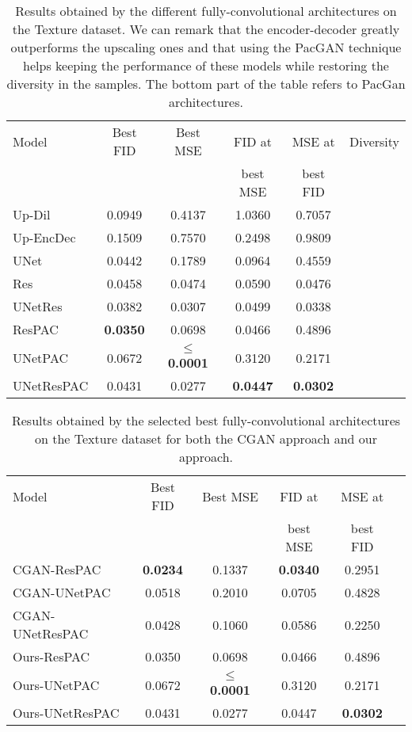 \begin{table}
	\centering
	\begin{tabular}{|l|c|c|c|c|c|}
		\hline
		Model           & Best FID & Best MSE & FID at & MSE at & Diversity\\
		&&&best MSE & best FID & \\
		\hline
		Up-Dil      & 0.0949 & 0.4137 & 1.0360 & 0.7057 & {\color{green}\cmark } \\
		Up-EncDec  & 0.1509 & 0.7570 & 0.2498 & 0.9809 & {\color{green}\cmark } \\
		UNet        & 0.0442 & 0.1789 & 0.0964 & 0.4559 & {\color{red}\xmark } \\
		Res      & 0.0458 & 0.0474 & 0.0590 & 0.0476 & {\color{red}\xmark } \\
		UNetRes & 0.0382 & 0.0307 & 0.0499 & 0.0338 & {\color{red}\xmark } \\
		\hline
		ResPAC &  \textbf{0.0350} & 0.0698 & 0.0466 & 0.4896 & {\color{green}\cmark } \\
		UNetPAC &  0.0672 & \textbf{$\leq$ 0.0001} & 0.3120 & 0.2171&  {\color{green}\cmark } \\
		UNetResPAC & 0.0431 & 0.0277 & \textbf{0.0447} & \textbf{0.0302} &  {\color{green}\cmark }\\
		\hline
	\end{tabular}
	
	\caption[Results on the Texture dataset for all the selected architectures]{Results obtained by the different fully-convolutional architectures on the Texture dataset. We can remark that the encoder-decoder greatly outperforms the upscaling ones and that using the PacGAN technique helps keeping the performance of these models while restoring the diversity in the samples. The bottom part of the table refers to PacGan architectures.}
	\label{tab:ablation}
\end{table}

\begin{table}[t]
	\centering
	\begin{tabular}{|l|c|c|c|c|c|}
		\hline
		Model           & Best FID & Best MSE & FID at & MSE at \\
		&&&best MSE & best FID  \\
		\hline
		CGAN-ResPAC &   \textbf{0.0234} & 0.1337 &  \textbf{0.0340} & 0.2951 \\
		CGAN-UNetPAC &  0.0518 & 0.2010 & 0.0705 & 0.4828\\
		CGAN-UNetResPAC & 0.0428 & 0.1060 & 0.0586 & 0.2250\\
		\hline
		Ours-ResPAC &  0.0350 & 0.0698 & 0.0466 & 0.4896\\
		Ours-UNetPAC &  0.0672 & \textbf{$\leq$ 0.0001}  & 0.3120 & 0.2171 \\
		Ours-UNetResPAC & 0.0431 & 0.0277 &0.0447 & \textbf{0.0302}\\
		\hline
	\end{tabular}
	
	\caption{Results obtained by the selected best fully-convolutional architectures on the Texture dataset for both the CGAN approach and our approach.}
	\label{tab:ablation-cgan}
\end{table}

